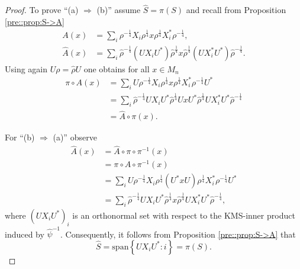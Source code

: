 \documentclass{amsart}
\begin{document}
\begin{proof}
    To prove ``(a) $\Rightarrow$ (b)'' assume $\hat{S} = \pi(S)$ and recall from Proposition \ref{pre::prop:S->A}
    \begin{align*}
        A(x) &= \sum_i\rho^{-\frac{1}{4}}X_i\rho^{\frac{1}{4}}x\rho^{\frac{1}{4}}X_i^*\rho^{-\frac{1}{4}}, \\
        \hat{A}(x) &= \sum_i \hat{\rho}^{-\frac{1}{4}}(U X_i U^\ast) \hat{\rho}^{\frac{1}{4}}x\hat{\rho}^{\frac{1}{4}} (U X_i^* U^\ast )\hat{\rho}^{-\frac{1}{4}}.
    \end{align*}
    Using again $U \rho = \hat{\rho} U$ one obtains for all $x \in M_n$
    \begin{align*}
        \pi \circ A(x)
            &= \sum_i U \rho^{-\frac{1}{4}} X_i \rho^{\frac{1}{4}} x \rho^{\frac{1}{4}}X_i^*\rho^{-\frac{1}{4}} U^\ast \\
            &= \sum_i \hat{\rho}^{-\frac{1}{4}} U X_i U^\ast \hat{\rho}^{\frac{1}{4}} U x U^\ast \hat{\rho}^{\frac{1}{4}} U X_i^* U^\ast \hat{\rho}^{-\frac{1}{4}} \\
            &= \hat{A} \circ \pi(x).
    \end{align*}

    For ``(b) $\Rightarrow$ (a)'' observe
    \begin{align*}
        \hat{A}(x) 
            &= \hat{A} \circ \pi \circ \pi^{-1}(x) \\
            &= \pi \circ A \circ \pi^{-1}(x) \\
            &= \sum_i U \rho^{-\frac{1}{4}}X_i\rho^{\frac{1}{4}} (U^\ast x U) \rho^{\frac{1}{4}}X_i^*\rho^{-\frac{1}{4}} U^\ast \\
            &= \sum_i \hat{\rho}^{-\frac{1}{4}} UX_i U^\ast \hat{\rho}^{\frac{1}{4}} x \hat{\rho}^{\frac{1}{4}} U X_i^* U^\ast \hat{\rho}^{-\frac{1}{4}},
    \end{align*}
    where $(UX_iU^\ast)_i$ is an orthonormal set with respect to the KMS-inner product induced by $\hat{\psi}^{-1}$. Consequently, it follows from Proposition \ref{pre::prop:S->A} that 
    $$
    \hat{S} = \mathrm{span}\left\{ UX_iU^\ast: i \right\} = \pi(S).
    $$


\end{proof}
\end{document}
